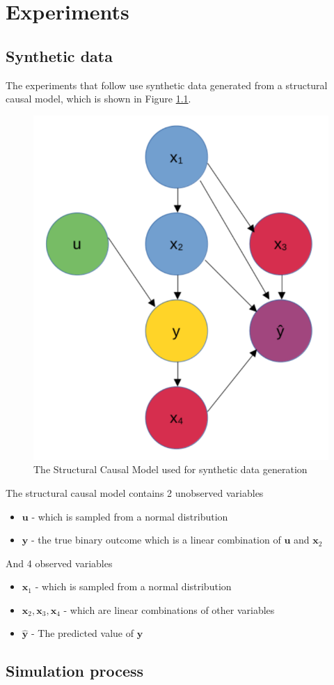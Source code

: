 \chapter{Experiments}

\section{Synthetic data}

The experiments that follow use synthetic data generated from a structural causal model, which is shown in Figure \ref{fig:scm}.

\begin{figure}[!htb]
	\centering
	\includegraphics[width=0.4\linewidth]{images/scm.png}
	\caption{The Structural Causal Model used for synthetic data generation}
	\label{fig:scm}
\end{figure}

The structural causal model contains 2 unobserved variables
\begin{itemize}
	\item $\mathbf{u}$ - which is sampled from a normal distribution
	\item $\mathbf{y}$ - the true binary outcome which is a linear combination of $\mathbf{u}$ and $\mathbf{x}_2$
\end{itemize}

And 4 observed variables
\begin{itemize}
	\item $\mathbf{x}_1$ - which is sampled from a normal distribution
	\item $\mathbf{x}_2,\mathbf{x}_3,\mathbf{x}_4$ - which are linear combinations of other variables
	\item $\hat{\mathbf{y}}$ - The predicted value of $\mathbf{y}$
\end{itemize}


\section{Simulation process}

